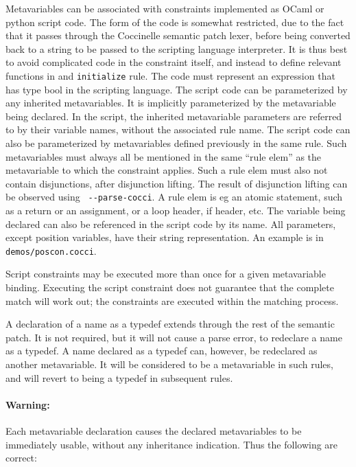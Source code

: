 Metavariables can be associated with constraints implemented as OCaml or
python script code.  The form of the code is somewhat restricted, due to
the fact that it passes through the Coccinelle semantic patch lexer, before
being converted back to a string to be passed to the scripting language
interpreter.  It is thus best to avoid complicated code in the constraint
itself, and instead to define relevant functions in and {\tt initialize}
rule.  The code must represent an expression that has type bool in the
scripting language.  The script code can be parameterized by any inherited
metavariables.  It is implicitly parameterized by the metavariable being
declared.  In the script, the inherited metavariable parameters are
referred to by their variable names, without the associated rule name.  The
script code can also be parameterized by metavariables defined previously
in the same rule.  Such metavariables must always all be mentioned in the
same ``rule elem'' as the metavariable to which the constraint applies.
Such a rule elem must also not contain disjunctions, after disjunction
lifting.  The result of disjunction lifting can be observed using {\tt
  -{}-parse-cocci}.  A rule elem is eg an atomic statement, such as a
return or an assignment, or a loop header, if header, etc.  The variable
being declared can also be referenced in the script code by its name.  All
parameters, except position variables, have their string representation.
An example is in {\tt demos/poscon.cocci}.

Script constraints may be executed more than once for a given metavariable
binding.  Executing the script constraint does not guarantee that the
complete match will work out; the constraints are executed within the
matching process.

A declaration of a name as a typedef extends through the rest of the
semantic patch.  It is not required, but it will not cause a parse error,
to redeclare a name as a typedef.  A name declared as a typedef can,
however, be redeclared as another metavariable.  It will be considered to
be a metavariable in such rules, and will revert to being a typedef in
subsequent rules.

\paragraph*{Warning:} Each metavariable declaration causes the declared
metavariables to be immediately usable, without any inheritance
indication.  Thus the following are correct:

